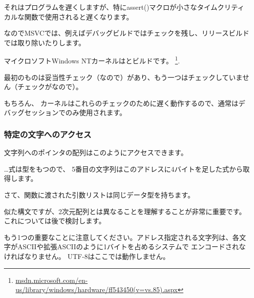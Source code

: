 それはプログラムを遅くしますが、特にassert()マクロが小さなタイムクリティカルな関数で使用されると遅くなります。

なのでMSVCでは、例えばデバッグビルドではチェックを残し、リリースビルドでは取り除いたりします。
 
マイクロソフト\gls{Windows NT}カーネルはとビルドです。
\footnote{\href{http://go.yurichev.com/17259}{msdn.microsoft.com/en-us/library/windows/hardware/ff543450(v=vs.85).aspx}}.

最初のものは妥当性チェック（なので）があり、もう一つはチェックしていません（チェックがなので）。

もちろん、 カーネルはこれらのチェックのために遅く動作するので、通常はデバッグセッションでのみ使用されます。


\subsubsection{特定の文字へのアクセス}

文字列へのポインタの配列はこのようにアクセスできます。



\dots {}式は型をもつので、
5番目の文字列はこのアドレスに4バイトを足した式から取得します。

さて、関数に渡された引数リストは同じデータ型を持ちます。



似た構文ですが、2次元配列とは異なることを理解することが非常に重要です。
これについては後で検討します。

もう1つの重要なことに注意してください。アドレス指定される文字列は、各文字が\ac{ASCII}や拡張\ac{ASCII}のように1バイトを占めるシステムで
エンコードされなければなりません。 
UTF-8はここでは動作しません。
